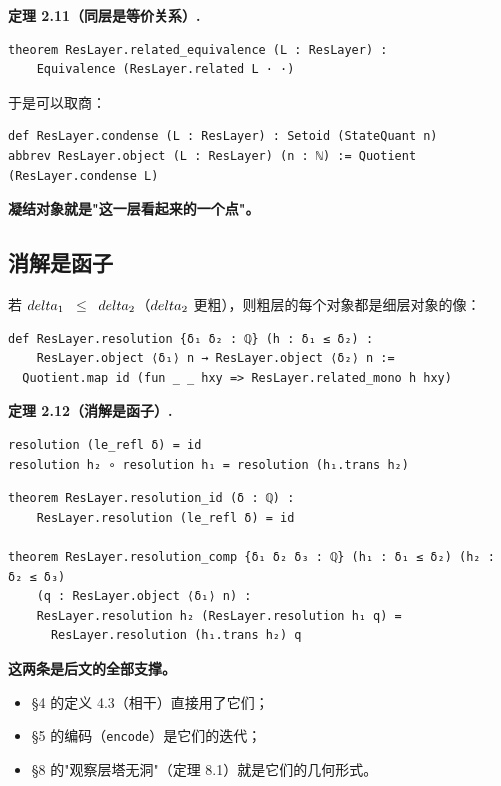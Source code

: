 \documentclass[11pt,a4paper]{ctexart}
\begin{document}
\textbf{定理 2.11（同层是等价关系）.}

\begin{lstlisting}
theorem ResLayer.related_equivalence (L : ResLayer) :
    Equivalence (ResLayer.related L · ·)
\end{lstlisting}

于是可以取商：

\begin{lstlisting}
def ResLayer.condense (L : ResLayer) : Setoid (StateQuant n)
abbrev ResLayer.object (L : ResLayer) (n : ℕ) := Quotient (ResLayer.condense L)
\end{lstlisting}

\textbf{凝结对象就是"这一层看起来的一个点"。}

\subsection{消解是函子}

若 \texttt{\ensuremath{\\delta_{1}} \ensuremath{\le} \ensuremath{\\delta_{2}}}（\texttt{\ensuremath{\\delta_{2}}} 更粗），则粗层的每个对象都是细层对象的像：

\begin{lstlisting}
def ResLayer.resolution {δ₁ δ₂ : ℚ} (h : δ₁ ≤ δ₂) :
    ResLayer.object ⟨δ₁⟩ n → ResLayer.object ⟨δ₂⟩ n :=
  Quotient.map id (fun _ _ hxy => ResLayer.related_mono h hxy)
\end{lstlisting}

\textbf{定理 2.12（消解是函子）.}

\begin{lstlisting}
resolution (le_refl δ) = id
resolution h₂ ∘ resolution h₁ = resolution (h₁.trans h₂)
\end{lstlisting}

\begin{lstlisting}
theorem ResLayer.resolution_id (δ : ℚ) :
    ResLayer.resolution (le_refl δ) = id

theorem ResLayer.resolution_comp {δ₁ δ₂ δ₃ : ℚ} (h₁ : δ₁ ≤ δ₂) (h₂ : δ₂ ≤ δ₃)
    (q : ResLayer.object ⟨δ₁⟩ n) :
    ResLayer.resolution h₂ (ResLayer.resolution h₁ q) =
      ResLayer.resolution (h₁.trans h₂) q
\end{lstlisting}

\textbf{这两条是后文的全部支撑。}

\begin{itemize}
\item §4 的定义 4.3（相干）直接用了它们；
\item §5 的编码（\texttt{encode}）是它们的迭代；
\item §8 的"观察层塔无洞"（定理 8.1）就是它们的几何形式。
\end{itemize}
\end{document}
